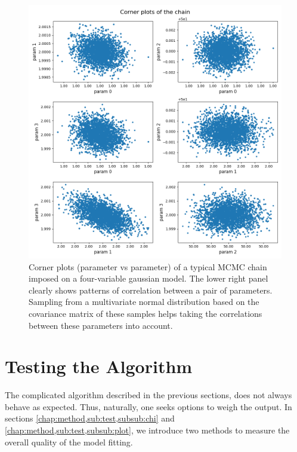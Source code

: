 \documentclass[12pt, TexShade, letterpaper]{report}
\begin{document}
\begin{figure}[h!]
\centering
\includegraphics[scale =0.6]{corner_plot_chain.png}
\caption[Corner plots of an MCMC chain]{Corner plots (parameter vs parameter) of a typical MCMC chain imposed on a four-variable gaussian model. The lower right panel clearly shows patterns of correlation between a pair of parameters. Sampling from a multivariate normal distribution based on the covariance matrix of these samples helps taking the correlations between these parameters into account.}
\label{fig:corner_plots}
\end{figure}

\section{Testing the Algorithm}
\label{chap:method,sub:test}
The complicated algorithm described in the previous sections, does not always behave as expected. Thus, naturally, one seeks options to weigh the output. In sections \ref{chap:method,sub:test,subsub:chi} and \ref{chap:method,sub:test,subsub:plot}, we introduce two methods to measure the overall quality of the model fitting.\par
\end{document}
